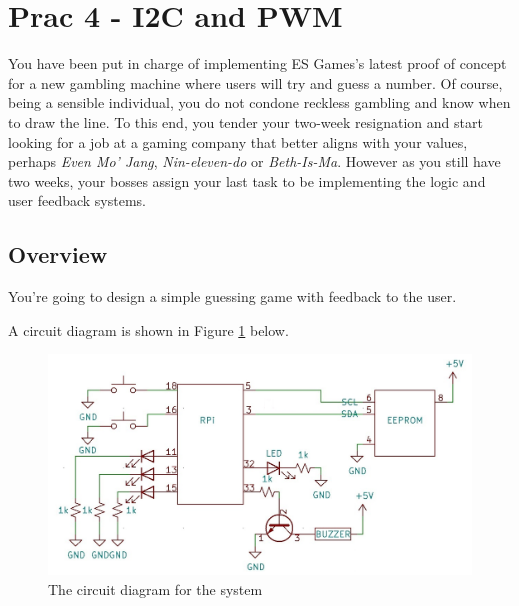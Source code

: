 \section{Prac 4 - I2C and PWM}
\label{sec:Prac4}
You have been put in charge of implementing ES Games's latest proof of concept for a new gambling machine where users will try and guess a number. Of course, being a sensible individual, you do not condone reckless gambling and know when to draw the line. To this end, you tender your two-week resignation and start looking for a job at a gaming company that better aligns with your values, perhaps \textit{Even Mo' Jang}, \textit{Nin-eleven-do} or  \textit{Beth-Is-Ma}. However as you still have two weeks, your bosses assign your last task to be implementing the logic and user feedback systems.

\subsection{Overview}
You're going to design a simple guessing game with feedback to the user.


A circuit diagram is shown in Figure \ref{fig:P4Circuit} below.

\begin{figure}[H]
\centering
\includegraphics[width=0.8\columnwidth]{Figures/P4Circuit.jpg}
\caption{The circuit diagram for the system}
\label{fig:P4Circuit}
\end{figure}


